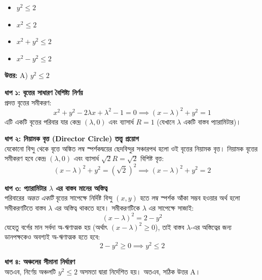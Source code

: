 \documentclass[12pt, a4paper]{article}
\begin{document}
\begin{itemize}[label={}, leftmargin=1cm, itemsep=0.5em]
    \item[\textbf{A)}] $y^2 \le 2$
    \item[\textbf{B)}] $x^2 \le 2$
    \item[\textbf{C)}] $x^2 + y^2 \le 2$
    \item[\textbf{D)}] $x^2 - y^2 \le 2$
\end{itemize}

\vspace{0.5em}
\begin{tcolorbox}[answerbox]
    \textbf{\color{success} উত্তর:} A) $y^2 \le 2$
\end{tcolorbox}
\vspace{1em}

\begin{tcolorbox}[solutionbox={সমাধান (Solution)}]
    \noindent
    \textbf{ধাপ ১: বৃত্তের সাধারণ বৈশিষ্ট্য নির্ণয়} \\
    প্রদত্ত বৃত্তের সমীকরণ: 
    \[ x^2 + y^2 - 2\lambda x + \lambda^2 - 1 = 0 \implies (x - \lambda)^2 + y^2 = 1 \]
    এটি একটি বৃত্তের পরিবার যার কেন্দ্র $(\lambda, 0)$ এবং ব্যাসার্ধ $R = 1$ (যেখানে $\lambda$ একটি বাস্তব প্যারামিটার)।
    
    \vspace{0.5em}
    \noindent\textbf{ধাপ ২: নিয়ামক বৃত্ত (Director Circle) তত্ত্ব প্রয়োগ} \\
    যেকোনো বিন্দু থেকে বৃত্তে অঙ্কিত লম্ব স্পর্শকদ্বয়ের ছেদবিন্দুর সঞ্চারপথ হলো ওই বৃত্তের নিয়ামক বৃত্ত। নিয়ামক বৃত্তের সমীকরণ হবে কেন্দ্র $(\lambda, 0)$ এবং ব্যাসার্ধ $\sqrt{2}R = \sqrt{2}$ বিশিষ্ট বৃত্ত:
    \[ (x - \lambda)^2 + y^2 = (\sqrt{2})^2 \implies (x - \lambda)^2 + y^2 = 2 \]
    
    \vspace{0.5em}
    \noindent\textbf{ধাপ ৩: প্যারামিটার $\lambda$ এর বাস্তব মানের অস্তিত্ব} \\
    পরিবারের \textit{অন্তত একটি} বৃত্তের সাপেক্ষে নির্দিষ্ট বিন্দু $(x, y)$ হতে লম্ব স্পর্শক আঁকা সম্ভব হওয়ার অর্থ হলো সমীকরণটিতে বাস্তব $\lambda$ এর অস্তিত্ব থাকতে হবে। সমীকরণটিকে $\lambda$ এর সাপেক্ষে সাজাই:
    \[ (x - \lambda)^2 = 2 - y^2 \]
    যেহেতু বর্গের মান সর্বদা অ-ঋণাত্মক হয় (অর্থাৎ $(x - \lambda)^2 \ge 0$), তাই বাস্তব $\lambda$-এর অস্তিত্বের জন্য ডানপক্ষকেও অবশ্যই অ-ঋণাত্মক হতে হবে:
    \[ 2 - y^2 \ge 0 \implies y^2 \le 2 \]
    
    \vspace{0.5em}
    \noindent\textbf{ধাপ ৪: অঞ্চলের সীমানা নির্ধারণ} \\
    অতএব, নির্ণেয় অঞ্চলটি $y^2 \le 2$ অসমতা দ্বারা নির্দেশিত হয়।
    অতএব, সঠিক উত্তর A।
\end{tcolorbox}
\end{document}
